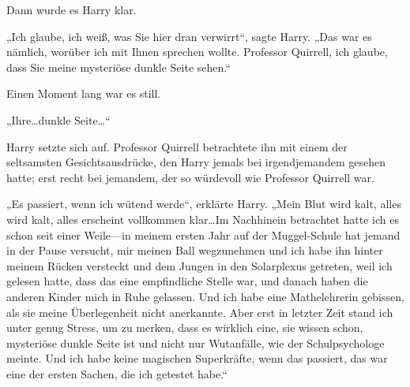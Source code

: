 Dann wurde es Harry klar.

„Ich glaube, ich weiß, was Sie hier dran verwirrt“, sagte Harry. „Das war es nämlich, worüber ich mit Ihnen sprechen wollte. Professor Quirrell, ich glaube, dass Sie meine mysteriöse dunkle Seite sehen.“

Einen Moment lang war es still.

„Ihre…dunkle Seite…“

Harry setzte sich auf. Professor Quirrell betrachtete ihn mit einem der seltsamsten Gesichtsausdrücke, den Harry jemals bei irgendjemandem gesehen hatte; erst recht bei jemandem, der so würdevoll wie Professor Quirrell war.

„Es passiert, wenn ich wütend werde“, erklärte Harry. „Mein Blut wird kalt, alles wird kalt, alles erscheint vollkommen klar…Im Nachhinein betrachtet hatte ich es schon seit einer Weile—in meinem ersten Jahr auf der Muggel-Schule hat jemand in der Pause versucht, mir meinen Ball wegzunehmen und ich habe ihn hinter meinem Rücken versteckt und dem Jungen in den Solarplexus getreten, weil ich gelesen hatte, dass das eine empfindliche Stelle war, und danach haben die anderen Kinder mich in Ruhe gelassen. Und ich habe eine Mathelehrerin gebissen, als sie meine Überlegenheit nicht anerkannte. Aber erst in letzter Zeit stand ich unter genug Stress, um zu merken, dass es wirklich eine, sie wissen schon, mysteriöse dunkle Seite ist und nicht nur Wutanfälle, wie der Schulpsychologe meinte. Und ich habe keine magischen Superkräfte, wenn das passiert, das war eine der ersten Sachen, die ich getestet habe.“

